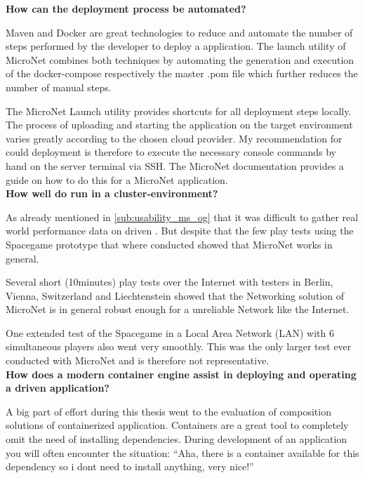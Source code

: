 \noindent
\textbf{How can the deployment process be automated?}

Maven and Docker are great technologies to reduce and automate the number of
steps performed by the developer to deploy a \ms{} application. The launch
utility of MicroNet combines both techniques by automating the generation and
execution of the docker-compose respectively the master .pom file which further
reduces the number of manual steps.

The MicroNet Launch utility provides shortcuts for all deployment steps locally.
The process of uploading and starting the application on the target environment
varies greatly according to the chosen cloud provider. My recommendation for
could deployment is therefore to execute the necessary console commands by hand
on the server terminal via SSH. The MicroNet documentation provides a guide on
how to do this\cite{micronet2017doku} for a MicroNet application.\\

\noindent
\textbf{How well do \ogs{} run in a cluster-environment?}

As already mentioned in \autoref{sub:usability_ms_og} that it was difficult to
gather real world performance data on \ms{} driven \ogs{}. But despite that the
few play tests using the Spacegame prototype that where conducted showed that
MicroNet works in general.

Several short (10minutes) play tests over the Internet with
testers in Berlin, Vienna, Switzerland and Liechtenstein showed that the
Networking solution of MicroNet is in general robust enough for a unreliable
Network like the Internet.

One extended test of the Spacegame in a Local Area Network (LAN) with 6
simultaneous players also went very smoothly. This was the only larger test
ever conducted with MicroNet and is therefore not representative.\\

\noindent
\textbf{How does a modern container engine assist in deploying and operating a
\ms{} driven application?}

A big part of effort during this thesis went to the evaluation of composition
solutions of containerized application. Containers are a great tool to
completely omit the need of installing dependencies. During development of an
application you will often encounter the situation: ``Aha, there is a
container available for this dependency so i dont need to install anything, very
nice!''

